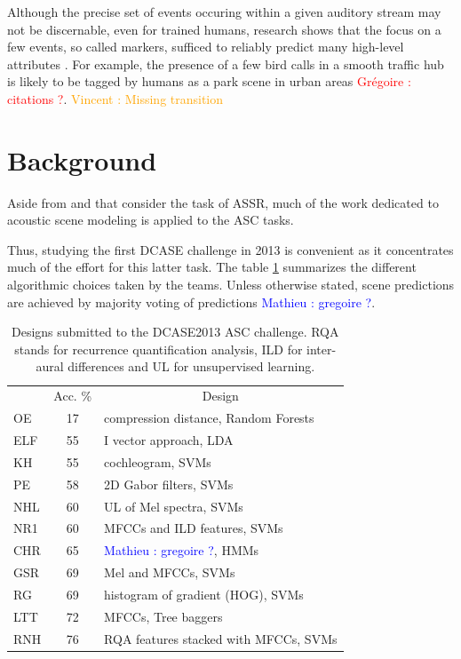 \documentclass[journal]{IEEEtran}
\newcommand{\vl}[1]{\textcolor{orange}{Vincent : #1}}
\newcommand{\gl}[1]{\textcolor{red}{Gr\'egoire : #1}}
\newcommand{\ml}[1]{\textcolor{blue}{ Mathieu : #1}}
\begin{document}
Although the precise set of events occuring within a given auditory stream may not be discernable, even for trained humans, research shows that the focus on a few events, so called markers,  sufficed to reliably predict many high-level attributes \cite{lafayPartI}.
For example, the presence of a few bird calls in a smooth traffic hub is likely to be tagged by humans as a park scene in urban areas \gl{citations ?}.
\vl{Missing transition}

\section{Background} \label{sec:soa}

Aside from \cite{aucouturier2007bag} and \cite{lagrange:hal-01082501} that consider the task of ASSR, much of the work dedicated to acoustic scene modeling is applied to the ASC tasks.

Thus, studying the first DCASE challenge \cite{barchiesi2015acoustic} in 2013 is convenient as it concentrates much of the effort for this latter task. The table \ref{tab:dcase} summarizes the different algorithmic choices taken by the teams. Unless otherwise stated, scene predictions are achieved by majority voting of predictions \ml{gregoire ?}.

\begin{table}
\begin{center}
\caption{Designs submitted to the DCASE2013 ASC challenge. RQA stands for recurrence quantification analysis, ILD for inter-aural differences and UL for unsupervised learning.  \label{tab:dcase}}
\begin{tabular}{lcl}
& Acc. \%  &  \multicolumn{1}{c}{Design}  \\
\cite{olivetti2013wonder} OE & 17 & compression distance, Random Forests \\
\cite{elizalde2013vector} ELF & 55 & I vector approach, LDA \\
\cite{krijnders2013tone} KH & 55 & cochleogram, SVMs \\
\cite{patil2013multiresolution} PE & 58 & 2D Gabor filters, SVMs \\
\cite{lee2013acoustic} NHL & 60 & UL of Mel spectra, SVMs \\
\cite{nogueira2013sound} NR1 & 60 & MFCCs and ILD features, SVMs \\
\cite{chum2013ieee} CHR & 65 & \ml{gregoire ?}, HMMs  \\
\cite{geiger2013large} GSR & 69 & Mel and MFCCs, SVMs \\
\cite{rakotomamonjy2015histogram} RG & 69  & histogram of gradient (HOG), SVMs \\
\cite{li2013auditory} LTT & 72 & MFCCs, Tree baggers \\
\cite{roma2013recurrence} RNH & 76 & RQA features stacked with MFCCs, SVMs \\
\end{tabular}
\end{center}
\end{table}
\end{document}

